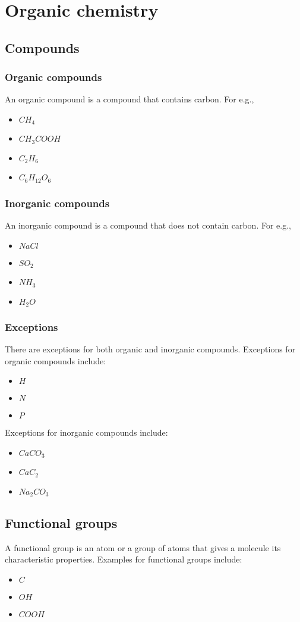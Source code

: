 \documentclass[11pt]{article}
\begin{document}
\section{Organic chemistry}
\label{sec:orgf15f810}
\subsection{Compounds}
\label{sec:orgf0b7b26}
\subsubsection{Organic compounds}
\label{sec:orgdb58bf1}
An organic compound is a compound that contains carbon. For e.g.,
\begin{itemize}
\item \(CH_4\)
\item \(CH_3COOH\)
\item \(C_2H_6\)
\item \(C_6H_{12}O_6\)
\end{itemize}
\subsubsection{Inorganic compounds}
\label{sec:org9b6d4dc}
An inorganic compound is a compound that does not contain carbon. For e.g.,
\begin{itemize}
\item \(NaCl\)
\item \(SO_2\)
\item \(NH_3\)
\item \(H_2O\)
\end{itemize}
\subsubsection{Exceptions}
\label{sec:org978fc89}
There are exceptions for both organic and inorganic compounds. Exceptions for organic compounds include:
\begin{itemize}
\item \(H\)
\item \(N\)
\item \(P\)
\end{itemize}
Exceptions for inorganic compounds include:
\begin{itemize}
\item \(CaCO_3\)
\item \(CaC_2\)
\item \(Na_2CO_3\)
\end{itemize}
\subsection{Functional groups}
\label{sec:org0fed373}
A functional group is an atom or a group of atoms that gives a molecule its characteristic properties. Examples for functional groups include:
\begin{itemize}
\item \(C\)
\item \(OH\)
\item \(COOH\)
\end{itemize}
\end{document}
